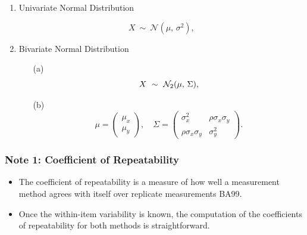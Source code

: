 \documentclass[compress]{beamer}        %
\begin{document}
\begin{frame}

\begin{enumerate}
\item Univariate Normal Distribution

\[
    X\ \sim\ \mathcal{N}(\mu,\, \sigma^2),
\]

\item Bivariate Normal Distribution

\begin{itemize}
\item[(a)] \[  X\ \sim\ \mathcal{N}_2(\mu,\, \Sigma), \vspace{1cm}\]
\item[(b)] \[    \mu = \begin{pmatrix} \mu_x \\ \mu_y \end{pmatrix}, \quad
    \Sigma = \begin{pmatrix} \sigma_x^2 & \rho \sigma_x \sigma_y \\
                             \rho \sigma_x \sigma_y  & \sigma_y^2 \end{pmatrix}.\]
\end{itemize}
\end{enumerate}


\end{frame}
\begin{frame}
\frametitle{Note 1: Coefficient of Repeatability}
\begin{itemize}
\item 
The coefficient of repeatability is a measure of how well a
measurement method agrees with itself over replicate measurements
\alert{BA99}. 

\item Once the within-item variability is known, the
computation of the coefficients of repeatability for both methods
is straightforward.

\end{itemize}
\end{frame}
\end{document}
